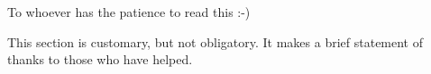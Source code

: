 

\null\vskip1.5in
\begin{center}

To whoever has the patience to read this :-)

This section is customary, but not obligatory.  It makes a brief statement of thanks to those who have helped.

\end{center}